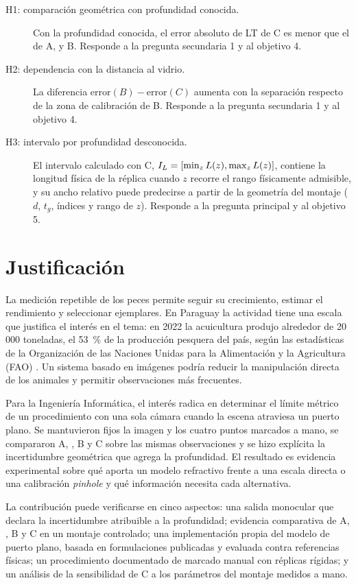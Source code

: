 \begin{description}
  \item[H1: comparación geométrica con profundidad conocida.] Con la profundidad conocida, el error absoluto de LT de C es menor que el de A, \Aprime{} y B. Responde a la pregunta secundaria 1 y al objetivo 4.
  \item[H2: dependencia con la distancia al vidrio.] La diferencia $\mathrm{error}(B) - \mathrm{error}(C)$ aumenta con la separación respecto de la zona de calibración de B. Responde a la pregunta secundaria 1 y al objetivo 4.
  \item[H3: intervalo por profundidad desconocida.] El intervalo calculado con C, $I_L = [\min_z L(z), \max_z L(z)]$, contiene la longitud física de la réplica cuando $z$ recorre el rango físicamente admisible, y su ancho relativo puede predecirse a partir de la geometría del montaje ($d$, $t_g$, índices y rango de $z$). Responde a la pregunta principal y al objetivo 5.
\end{description}

\section{Justificación}

La medición repetible de los peces permite seguir su crecimiento, estimar el rendimiento y seleccionar ejemplares. En Paraguay la actividad tiene una escala que justifica el interés en el tema: en 2022 la acuicultura produjo alrededor de 20\,000 toneladas, el 53~\% de la producción pesquera del país, según las estadísticas de la Organización de las Naciones Unidas para la Alimentación y la Agricultura (FAO) \parencite{Cai2025}. Un sistema basado en imágenes podría reducir la manipulación directa de los animales y permitir observaciones más frecuentes.

Para la Ingeniería Informática, el interés radica en determinar el límite métrico de un procedimiento con una sola cámara cuando la escena atraviesa un puerto plano. Se mantuvieron fijos la imagen y los cuatro puntos marcados a mano, se compararon A, \Aprime, B y C sobre las mismas observaciones y se hizo explícita la incertidumbre geométrica que agrega la profundidad. El resultado es evidencia experimental sobre qué aporta un modelo refractivo frente a una escala directa o una calibración \emph{pinhole} y qué información necesita cada alternativa.

La contribución puede verificarse en cinco aspectos: una salida monocular que declara la incertidumbre atribuible a la profundidad; evidencia comparativa de A, \Aprime, B y C en un montaje controlado; una implementación propia del modelo de puerto plano, basada en formulaciones publicadas y evaluada contra referencias físicas; un procedimiento documentado de marcado manual con réplicas rígidas; y un análisis de la sensibilidad de C a los parámetros del montaje medidos a mano.

